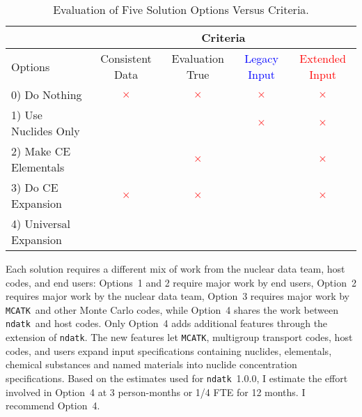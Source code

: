 \documentclass[12pt]{lamemo}
\newcommand{\ndatk}{\texttt{ndatk}}
\newcommand{\MCATK}{\texttt{MCATK}}
\newcommand{\mcm}{\textcolor{green}{\checkmark}}
\newcommand{\mxm}{\textcolor{red}{$\times$}}
\begin{document}
\begin{table}\centering
  \caption{Evaluation of Five Solution Options Versus
    Criteria.}\label{tbl:summary}
\begin{tabular}{l|cccc} 
  & \multicolumn{4}{c}{Criteria} \\ \hline
  Options & Consistent Data & Evaluation True &
  \textcolor{blue}{Legacy Input} & \textcolor{red}{Extended Input} \\ \hline
  0) Do Nothing          & \mxm & \mxm & \mxm & \mxm \\
  1) Use Nuclides Only   & \mcm & \mcm & \mxm & \mxm \\
  2) Make CE Elementals  & \mcm & \mxm & \mcm & \mxm \\
  3) Do CE Expansion     & \mxm & \mxm & \mcm & \mxm \\
  4) Universal Expansion & \mcm & \mcm & \mcm & \mcm
\end{tabular}
\end{table}
Each solution requires a different mix of work from the nuclear data
team, host codes, and end users: Options~1 and 2 require major work by
end users, Option~2 requires major work by the nuclear data team,
Option~3 requires major work by \MCATK\ and other Monte Carlo codes,
while Option~4 shares the work between \ndatk\ and host codes.  Only
Option~4 adds additional features through the extension of \ndatk.
The new features let \MCATK, multigroup transport codes, host codes,
and users expand input specifications containing nuclides, elementals,
chemical substances and named materials into nuclide concentration
specifications.  Based on the estimates used for \ndatk\ 1.0.0, I
estimate the effort involved in Option~4 at 3 person-months or 1/4 FTE
for 12 months.  I recommend Option~4.
\end{document}
